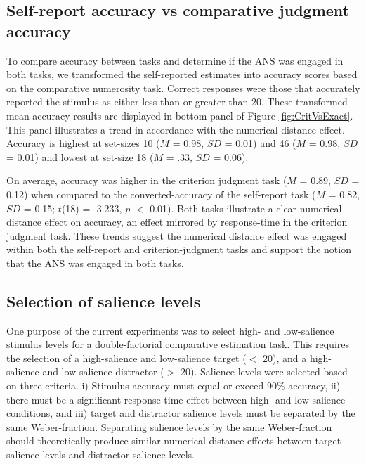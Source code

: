 \subsection{Self-report accuracy vs comparative judgment accuracy}
To compare accuracy between tasks and determine if the ANS was engaged in both tasks, we transformed the self-reported estimates into accuracy scores based on the comparative numerosity task. Correct responses were those that accurately reported the stimulus as either less-than or greater-than 20. These transformed mean accuracy results are displayed in bottom panel of Figure \ref{fig:CritVsExact}. This panel illustrates a trend in accordance with the numerical distance effect. Accuracy is highest at set-sizes 10 ($M$ = 0.98, $SD$ = 0.01) and 46 ($M$ = 0.98, $SD$ = 0.01) and lowest at set-size 18 ($M$ = .33, $SD$ = 0.06). 

On average, accuracy was higher in the criterion judgment task ($M$ = 0.89, $SD$ = 0.12) when compared to the converted-accuracy of the self-report task ($M$ = 0.82, $SD$ = 0.15; $t$(18) = -3.233, $p$ $<$ 0.01). Both tasks illustrate a clear numerical distance effect on accuracy, an effect mirrored by response-time in the criterion judgment task. These trends suggest the numerical distance effect was engaged within both the self-report and criterion-judgment tasks and support the notion that the ANS was engaged in both tasks. 

\subsection{Selection of salience levels}
One purpose of the current experiments was to select high- and low-salience stimulus levels for a double-factorial comparative estimation task. This requires the selection of a high-salience and low-salience target ($<$ 20), and a high-salience and low-salience distractor ($>$ 20). Salience levels were selected based on three criteria. i) Stimulus accuracy must equal or exceed 90\% accuracy, ii) there must be a significant response-time effect between high- and low-salience conditions, and iii) target and distractor salience levels must be separated by the same Weber-fraction. Separating salience levels by the same Weber-fraction should theoretically produce similar numerical distance effects between target salience levels and distractor salience levels.

